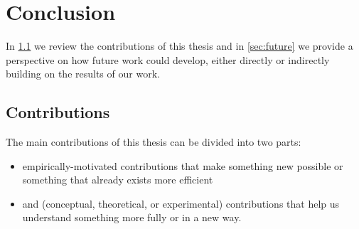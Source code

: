 \chapter{Conclusion} \label{chapter:conclusion} %

In \cref{sec:contributions} we review the contributions of this thesis and in \cref{sec:future} we provide a perspective on how future work could develop, either directly or indirectly building on the results of our work.

\section{Contributions} \label{sec:contributions}


The main contributions of this thesis can be divided into two parts:
\begin{itemize}
\item empirically-motivated contributions that make something new possible or something that already exists more efficient
\item and (conceptual, theoretical, or experimental) contributions that help us understand something more fully or in a new way.
\end{itemize}


